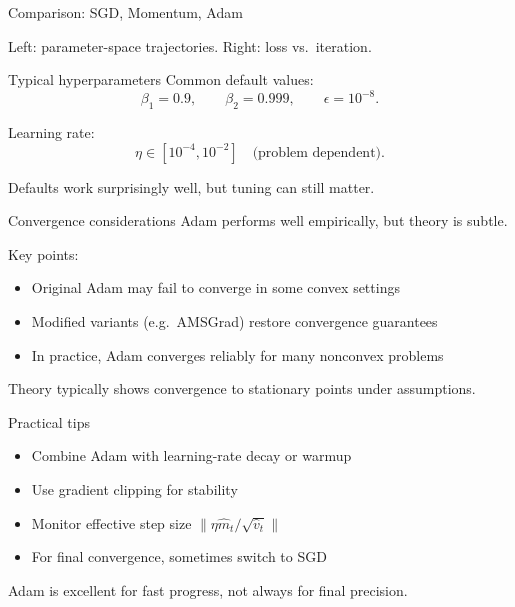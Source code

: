 \documentclass[compress]{beamer}
\begin{document}
\begin{frame}{Comparison: SGD, Momentum, Adam}
\begin{center}
\end{center}
{\small Left: parameter-space trajectories. Right: loss vs.\ iteration.}
\end{frame}

\begin{frame}{Typical hyperparameters}
Common default values:
\[
\beta_1 = 0.9,
\qquad
\beta_2 = 0.999,
\qquad
\epsilon = 10^{-8}.
\]

Learning rate:
\[
\eta \in [10^{-4}, 10^{-2}] \quad \text{(problem dependent)}.
\]

Defaults work surprisingly well, but tuning can still matter.
\end{frame}

\begin{frame}{Convergence considerations}
Adam performs well empirically, but theory is subtle.

Key points:
\begin{itemize}
\item Original Adam may fail to converge in some convex settings
\item Modified variants (e.g.\ AMSGrad) restore convergence guarantees
\item In practice, Adam converges reliably for many nonconvex problems
\end{itemize}

Theory typically shows convergence to stationary points under assumptions.
\end{frame}

\begin{frame}{Practical tips}
\begin{itemize}
\item Combine Adam with learning-rate decay or warmup
\item Use gradient clipping for stability
\item Monitor effective step size $\|\eta \hat m_t/\sqrt{\hat v_t}\|$
\item For final convergence, sometimes switch to SGD
\end{itemize}
Adam is excellent for fast progress, not always for final precision.
\end{frame}
\end{document}
